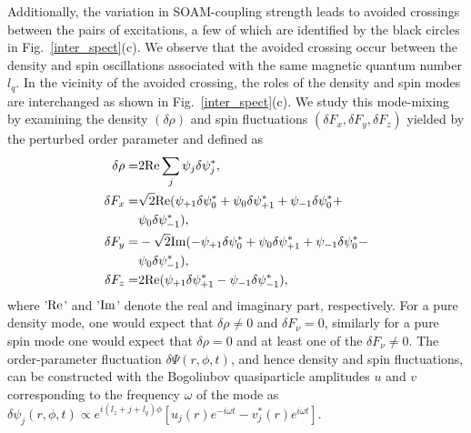 \documentclass[pra,twocolumn,aps,superscriptaddress,showpacs,longbibliography]{revtex4-1}
\begin{document}
Additionally, the variation in SOAM-coupling strength leads to avoided crossings between the pairs of excitations,
a few of which are identified by the black circles in Fig.~\ref{inter_spect}(c). We observe that the avoided crossing
occur between the density and spin oscillations associated with the same magnetic quantum number $l_q$. In the vicinity of the avoided crossing, the roles of 
the density and spin modes are interchanged as shown in Fig.~\ref{inter_spect}(c).  We study this mode-mixing by examining the density $(\delta \rho)$  and spin fluctuations $(\delta F_x, \delta F_y, \delta F_z)$ yielded by the perturbed order parameter and defined as 
\begin{subequations}
\begin{align}
\delta \rho=&2 {\rm Re} \sum_j \psi_j \delta \psi_j^*,\\
\delta F_x =& \sqrt{2} {\rm Re}(\psi_{+1}\delta \psi_0^*+
\psi_0\delta \psi_{+1}^* 
+\psi_{-1}\delta \psi_0^* +\nonumber\\&
\psi_0 \delta \psi_{-1}^*),\\
\delta F_y =& -\sqrt{2} {\rm Im}( -\psi_{+1} \delta \psi_0^*+
\psi_0\delta \psi_{+1}^* 
+\psi_{-1}\delta \psi_0^* -\nonumber\\&
\psi_0\delta \psi_{-1}^*) ,\\
\delta F_z =& 2{\rm Re}(\psi_{+1} \delta \psi_{+1}^*-
\psi_{-1}\delta \psi_{-1}^*),
\end{align}
\end{subequations}
where '${\rm Re}$' and '$\rm Im$' denote the real and imaginary part, respectively. For a pure density mode, one would expect that $\delta \rho \ne 0$
and  $\delta F_{\nu} = 0$, similarly for a pure spin mode one would
expect that $\delta \rho = 0$ and at least one of the $\delta F_{\nu} \ne 0$. The order-parameter fluctuation $\delta \Psi(r,\phi,t)$, and hence
density and spin fluctuations,
can be constructed with the Bogoliubov quasiparticle amplitudes $u$ and $v$ corresponding to the frequency $\omega$ of the mode {\color{black} as  
$\delta \psi_j(r,\phi,t) \propto e^{i(l_z+j+l_q)\phi}\left[u_j(r) e^{-i\omega t}-v_j^*(r) e^{i\omega t}\right]$.}
\end{document}

